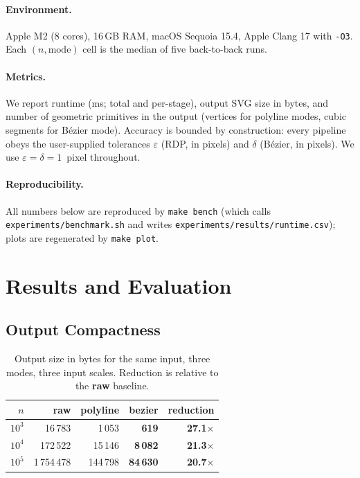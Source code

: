 \documentclass[twocolumn,a4paper,10pt]{article}
\begin{document}
\paragraph*{Environment.}  Apple M2 (8 cores), 16\,GB RAM, macOS
Sequoia 15.4, Apple Clang 17 with \texttt{-O3}.  Each $(n,\text{mode})$
cell is the median of five back-to-back runs.

\paragraph*{Metrics.}  We report runtime (ms; total and per-stage),
output SVG size in bytes, and number of geometric primitives in the
output (vertices for polyline modes, cubic segments for B\'ezier
mode).  Accuracy is bounded by construction: every pipeline obeys
the user-supplied tolerances $\varepsilon$ (RDP, in pixels) and
$\delta$ (B\'ezier, in pixels).  We use $\varepsilon=\delta=1$~pixel
throughout.

\paragraph*{Reproducibility.}  All numbers below are reproduced by
\texttt{make bench} (which calls \texttt{experiments/benchmark.sh}
and writes \texttt{experiments/results/runtime.csv}); plots are
regenerated by \texttt{make plot}.

\section{Results and Evaluation}
\label{sec:results}

\subsection{Output Compactness}

\begin{table}[h]
\caption{Output size in bytes for the same input, three modes,
         three input scales.  Reduction is relative to the
         \textbf{raw} baseline.}
\label{tab:size}
\centering
\begin{tabular}{@{}rrrrr@{}}
\toprule
$n$       & raw           & polyline    & \textbf{bezier}   & \textbf{reduction} \\ \midrule
$10^3$   & 16\,783      & 1\,053       & \textbf{619}      & \textbf{27.1$\times$} \\
$10^4$   & 172\,522     & 15\,146      & \textbf{8\,082}   & \textbf{21.3$\times$} \\
$10^5$   & 1\,754\,478  & 144\,798     & \textbf{84\,630}  & \textbf{20.7$\times$} \\ \bottomrule
\end{tabular}
\end{table}
\end{document}
